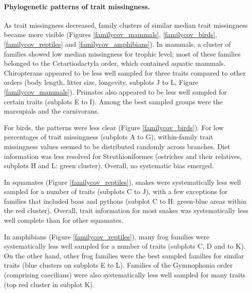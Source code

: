 \newpage

\paragraph{Phylogenetic patterns of trait missingness.}
As trait missingness decreased, family clusters of similar median trait missingness became more visible (Figures \ref{familycov_mammals}, \ref{familycov_birds}, \ref{familycov_reptiles} and \ref{familycov_amphibians}). In mammals, a cluster of families showed low median missingness for trophic level; most of these families belonged to the Cetartiodactyla order, which contained aquatic mammals. Chiropterans appeared to be less well sampled for three traits compared to other orders (body length, litter size, longevity, subplots J to L, Figure \ref{familycov_mammals}). Primates also appeared to be less well sampled for certain traits (subplots E to I). Among the best sampled groups were the marsupials and the carnivorans.

For birds, the patterns were less clear (Figure \ref{familycov_birds}). For low percentages of trait missingness (subplots A to G), within-family trait missingness values seemed to be distributed randomly across branches. Diet information was less resolved for Struthioniformes (ostriches and their relatives, subplots H and L: green cluster). Overall, no systematic bias emerged.

In squamates (Figure \ref{familycov_reptiles}), snakes were systematically less well sampled for a number of traits (subplots C to J), with a few exceptions for families that included boas and pythons (subplot C to H: green-blue areas within the red cluster). Overall, trait information for most snakes was systematically less well complete than for other squamates.

In amphibians (Figure \ref{familycov_reptiles}), many frog families were systematically less well sampled for a number of traits (subplots C, D and to K). On the other hand, other frog families were the best sampled families for similar traits (blue clusters on subplots E to L). Families of the Gymnophonia order (comprising caecilians) were also systematically less well sampled for many traits (top red cluster in subplot K).

